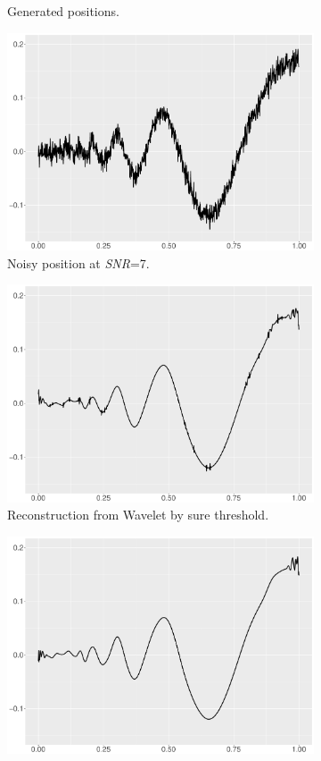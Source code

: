\begin{figure}
\begin{subfigure}{0.45\textwidth}
    \caption{Generated positions.}
    \end{subfigure}
    \begin{subfigure}{0.45\textwidth}
    \centering
    \includegraphics[width=\linewidth,height=0.45\textwidth]{Chapters/02TractorSplineTheory/plot/ggplot/ggDopplerPositionNoise.pdf}
    \caption{Noisy position at \textit{SNR}=7.}
    \end{subfigure}
    \begin{subfigure}{0.45\textwidth}
    \centering
    \includegraphics[width=\linewidth,height=0.45\textwidth]{Chapters/02TractorSplineTheory/plot/ggplot/ggDopplerSure.pdf}
    \caption{Reconstruction from Wavelet by sure threshold.}
    \end{subfigure}
    \begin{subfigure}{0.45\textwidth}
    \centering
    \includegraphics[width=\linewidth,height=0.45\textwidth]{Chapters/02TractorSplineTheory/plot/ggplot/ggDopplerBayes.pdf}

\end{subfigure}
\end{figure}

